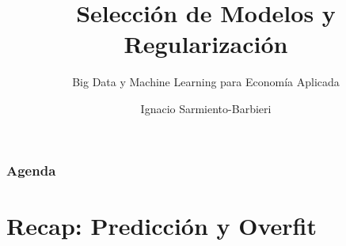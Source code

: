 \documentclass[
  shownotes,
  xcolor={svgnames},
  hyperref={colorlinks,citecolor=DarkBlue,linkcolor=andesred,urlcolor=DarkBlue}
  , aspectratio=169]{beamer}
\begin{document}
\title{Selección de Modelos y Regularización}
\subtitle{Big Data y Machine Learning para Economía Aplicada}
\date{}

\author[Sarmiento-Barbieri]{Ignacio Sarmiento-Barbieri}



\begin{frame}[noframenumbering]
\maketitle
\end{frame}
\begin{frame}
\frametitle{Agenda}

\tableofcontents


\end{frame}
\section{Recap: Predicción y Overfit} 
\end{document}
